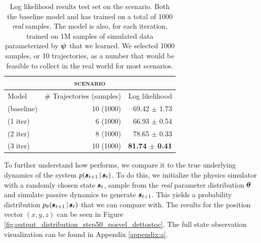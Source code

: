 \begin{table}
\centering

\begin{tabular}{lrr}
\multicolumn{3}{c}{\MakeLowercase{\textsc{\ws{} scenario}}} \\
\toprule
Model & \# Trajectories (samples) & Log likelihood  \\
\midrule

\cvae{} (baseline) & 10 (1000) & 69.42 $\pm$ 1.73\\


\dettostoc{} (1 iter) & 6 (1000) & 66.93 $\pm$ 0.54 \\
\dettostoc{} (2 iter) & 8 (1000) & 78.65 $\pm$ 0.33 \\

\dettostoc{} (3 iter) & 10 (1000) & \textbf{81.74 $\pm$ 0.41} \\

\bottomrule
\end{tabular}
\bigskip

\caption{Log likelihood results test set on the \ws{} scenario. Both the baseline model and \dettostoc{} has trained on a total of 1000 \emph{real} samples. The \dettostoc{} model is also, for each iteration, trained on 1M samples of simulated data parameterized by $\boldsymbol{\psi}$ that we learned. We selected 1000 samples, or 10 trajectories, as a number that would be feasible to collect in the real world for most scenarios.}
\label{table:windyslope_results}
\end{table}

To further understand how \dettostoc{} performs, we compare it to the true underlying dynamics of the system $p \given{\vns}{\vs}$. To do this, we initialize the physics simulator with a randomly chosen state $\pmb{s}_t$, sample from the \emph{real} parameter distribution $\boldsymbol{\theta}$ and simulate passive dynamics to generate $\pmb{s}_{t+1}$. This yields a probability distribution $\ptheta \given{\vns}{\vs}$ that we can compare with. The results for the position vector $(x,y,z)$ can be seen in Figure \ref{fig:output_distribution_step50_posvel_dettostoc}. The full state observation visualization can be found in Appendix \ref{appendix:a}.

